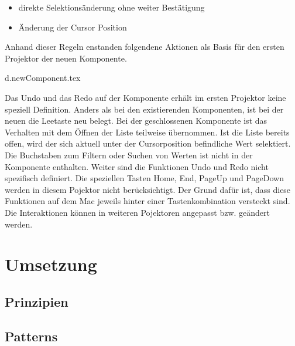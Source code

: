 \begin{itemize}
    \item direkte Selektionsänderung ohne weiter Bestätigung
    \item Änderung der Cursor Position
\end{itemize}

\noindent
Anhand dieser Regeln enstanden folgendene Aktionen als Basis für den ersten Projektor der neuen Komponente. 


\clearpage
{d.newComponent.tex}

Das Undo und das Redo auf der Komponente erhält im ersten Projektor keine speziell Definition.
Anders als bei den existierenden Komponenten, ist bei der neuen die Leetaste neu belegt. 
Bei der geschlossenen Komponente ist das Verhalten mit dem Öffnen der Liste teilweise übernommen.
Ist die Liste bereits offen, wird der sich aktuell unter der Cursorposition befindliche Wert selektiert.
Die Buchstaben zum Filtern oder Suchen von Werten ist nicht in der Komponente enthalten.
Weiter sind die Funktionen Undo und Redo nicht spezifisch definiert.
Die speziellen Tasten Home, End, PageUp und PageDown werden in diesem Pojektor nicht berücksichtigt.
Der Grund dafür ist, dass diese Funktionen auf dem Mac jeweils hinter einer Tastenkombination versteckt sind.
Die Interaktionen können in weiteren Pojektoren angepasst bzw. geändert werden.



\section{Umsetzung}



\subsection{Prinzipien}



\subsection{Patterns}



